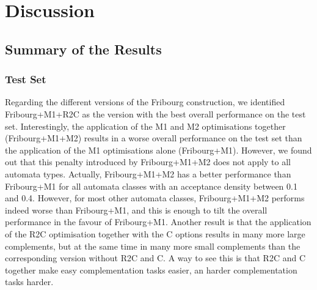 
\section{Discussion}
\label{5_discussion}











\subsection{Summary of the Results}
\label{5_summary}



\subsubsection{\goal{} Test Set}
Regarding the different versions of the Fribourg construction, we identified Fribourg+M1+R2C as the version with the best overall performance on the \goal{} test set. Interestingly, the application of the M1 and M2 optimisations together (Fribourg+M1+M2) results in a worse overall performance on the \goal{} test set than the application of the M1 optimisations alone (Fribourg+M1). However, we found out that this penalty introduced by Fribourg+M1+M2 does not apply to all automata types. Actually, Fribourg+M1+M2 has a better performance than Fribourg+M1 for all automata classes with an acceptance density between 0.1 and 0.4. However, for most other automata classes, Fribourg+M1+M2 performs indeed worse than Fribourg+M1, and this is enough to tilt the overall performance in the favour of Fribourg+M1. Another result is that the application of the R2C optimisation together with the C options results in many more large complements, but at the same time in many more small complements than the corresponding version without R2C and C. A way to see this is that R2C and C together make easy complementation tasks easier, an harder complementation tasks harder.

